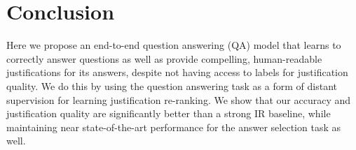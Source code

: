 \section{Conclusion}

Here we propose an end-to-end question answering (QA) model that learns to correctly answer questions as well as provide compelling, human-readable justifications for its answers,  despite not having access to labels for justification quality.  We do this by using the question answering task as a form of distant supervision for learning  justification re-ranking.  We show that our accuracy and justification quality are significantly better than a strong IR baseline, while maintaining near state-of-the-art performance for the answer selection task as well.
